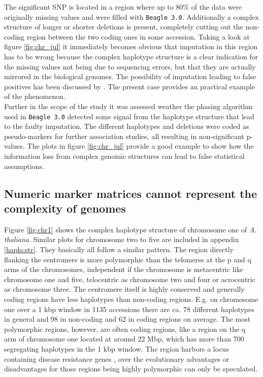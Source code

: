 The significant SNP is located in a region where up to 80\% of the data were originally
missing values and were filled with \texttt{Beagle 3.0}. Additionally a complex structure of longer
or shorter deletions is present, completely cutting out the non-coding region between the
two coding ones in some accession. Taking a look at figure \ref{fig:chr_jul} it immediately becomes obvious
that imputation in this region has to be wrong because the complex haplotype structure is
a clear indication for the missing values not being due to sequencing errors, but that
they are actually mirrored in the biological genomes. The possibility of imputation
leading to false positives has been discussed by \cite{lin2010new}. The present case
provides an practical example of the phenomenon. \\
Further in the scope of the study it was assessed weather the phasing algorithm used in
\texttt{Beagle 3.0} detected some signal from the haplotype structure that lead to the faulty
imputation. The different haplotypes and deletions were coded as pseudo-markers for
further association studies, all resulting in non-significant p-values. The plots in
figure \ref{fig:chr_jul} provide a good example to show how the information loss from
complex genomic structures can lead to false statistical assumptions.

\subsection{Numeric marker matrices cannot represent the complexity of genomes}

Figure \ref{fig:chr1} shows the complex haplotype structure of chromosome one of
\textit{A. thaliana}. Similar plots for chromosome two to five are included in appendix
\ref{haplo:str}. They basically all follow a similar pattern. The region directly flanking
the centromere is more polymorphic than the telomeres at the p and q arms of the
chromosomes, independent if the chromosome is metacentric like chromosome one and five,
telocentric as chromosome two and four or acrocentric as chromosome three. The centromere
itself is highly conserved and generally coding regions have less haplotypes than
non-coding regions. E.g. on chromosome one over a 1 kbp window in 1135 accessions there
are ca. 78 different haplotypes in general and 98 in non-coding and 62 in coding regions
on average. The most polymorphic regions, however, are often coding regions, like a region
on the q arm of chromosome one located at around 22 Mbp, which has more than 700
segregating haplotypes in the 1 kbp window. The region harbors a locus containing disease
resistance genes \cite{cheng2017araport11}, over the evolutionary advantages or
disadvantages for those regions being highly polymorphic can only be speculated.

